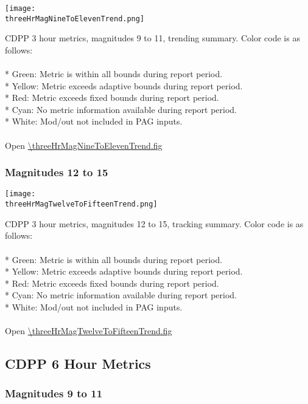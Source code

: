 \begin{center}
\texttt{[image: \\threeHrMagNineToElevenTrend.png]}
\end{center}
CDPP 3 hour metrics, magnitudes 9 to 11, trending summary. Color code is as follows:\\
\\
* Green: Metric is within all bounds during report period.\\
* Yellow: Metric exceeds adaptive bounds during report period.\\
* Red: Metric exceeds fixed bounds during report period.\\
* Cyan: No metric information available during report period.\\
* White: Mod/out not included in PAG inputs.\\
\\
Open \url{\threeHrMagNineToElevenTrend.fig}

\newpage

\subsubsection{Magnitudes 12 to 15}

\begin{center}
\texttt{[image: \\threeHrMagTwelveToFifteenTrend.png]}
\end{center}
CDPP 3 hour metrics, magnitudes 12 to 15, tracking summary. Color code is as follows:\\
\\
* Green: Metric is within all bounds during report period.\\
* Yellow: Metric exceeds adaptive bounds during report period.\\
* Red: Metric exceeds fixed bounds during report period.\\
* Cyan: No metric information available during report period.\\
* White: Mod/out not included in PAG inputs.\\
\\
Open \url{\threeHrMagTwelveToFifteenTrend.fig}

\newpage

\subsection{CDPP 6 Hour Metrics}

\subsubsection{Magnitudes 9 to 11}

